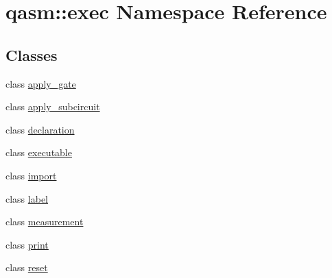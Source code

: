 \hypertarget{namespaceqasm_1_1exec}{}\section{qasm\+:\+:exec Namespace Reference}
\label{namespaceqasm_1_1exec}
\subsection*{Classes}
\begin{DoxyCompactItemize}
\item 
class \hyperlink{classqasm_1_1exec_1_1apply__gate}{apply\+\_\+gate}
\item 
class \hyperlink{classqasm_1_1exec_1_1apply__subcircuit}{apply\+\_\+subcircuit}
\item 
class \hyperlink{classqasm_1_1exec_1_1declaration}{declaration}
\item 
class \hyperlink{classqasm_1_1exec_1_1executable}{executable}
\item 
class \hyperlink{classqasm_1_1exec_1_1import}{import}
\item 
class \hyperlink{classqasm_1_1exec_1_1label}{label}
\item 
class \hyperlink{classqasm_1_1exec_1_1measurement}{measurement}
\item 
class \hyperlink{classqasm_1_1exec_1_1print}{print}
\item 
class \hyperlink{classqasm_1_1exec_1_1reset}{reset}
\end{DoxyCompactItemize}
